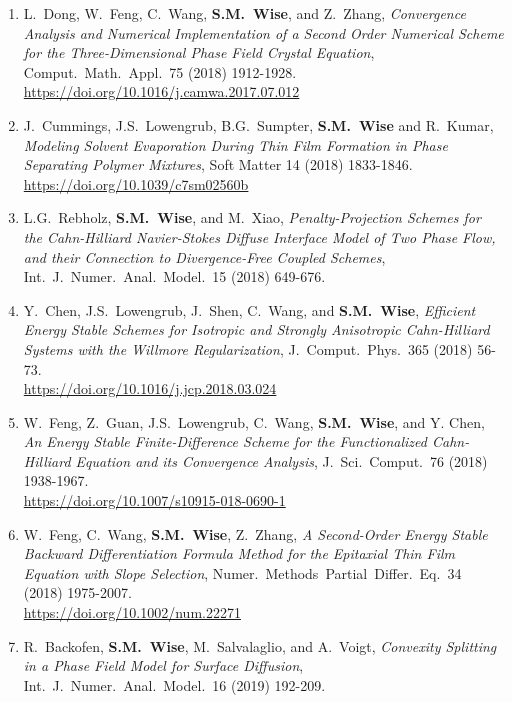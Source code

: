 \documentclass[11pt]{letter}
\begin{document}
\begin{enumerate}
	\item
L.~Dong, W.~Feng, C.~Wang, \textbf{S.M.~Wise}, and Z.~Zhang, {\sl Convergence Analysis and Numerical Implementation of a Second Order Numerical Scheme for the Three-Dimensional Phase Field Crystal Equation}, Comput.~Math.~Appl.~75 (2018) 1912-1928.
	\\ 
\url{https://doi.org/10.1016/j.camwa.2017.07.012}

	\item
J.~Cummings, J.S.~Lowengrub, B.G.~Sumpter, \textbf{S.M.~Wise} and R.~Kumar, {\sl Modeling Solvent Evaporation During Thin Film Formation in Phase Separating Polymer Mixtures}, Soft Matter 14 (2018) 1833-1846.
	\\ 
\url{https://doi.org/10.1039/c7sm02560b}

	\item
L.G.~Rebholz, \textbf{S.M.~Wise}, and M.~Xiao, {\it Penalty-Projection Schemes for the Cahn-Hilliard Navier-Stokes Diffuse Interface Model of Two Phase Flow, and their Connection to Divergence-Free Coupled Schemes}, Int.~J.~Numer.~Anal.~Model.~15 (2018) 649-676.

	\item
Y.~Chen, J.S.~Lowengrub, J.~Shen, C.~Wang, and \textbf{S.M.~Wise}, {\sl Efficient Energy Stable Schemes for Isotropic and Strongly Anisotropic Cahn-Hilliard Systems with the Willmore Regularization}, J.~Comput.~Phys.~365 (2018) 56-73.
	\\
\url{https://doi.org/10.1016/j.jcp.2018.03.024}

	\item
W.~Feng, Z.~Guan, J.S.~Lowengrub, C.~Wang, \textbf{S.M.~Wise}, and Y. Chen, {\sl An Energy Stable Finite-Difference Scheme for the Functionalized Cahn-Hilliard Equation and its Convergence Analysis}, J.~Sci.~Comput.~76 (2018) 1938-1967.
	\\ 
\url{https://doi.org/10.1007/s10915-018-0690-1}

	\item
W.~Feng, C.~Wang, \textbf{S.M.~Wise},  Z.~Zhang, {\sl A Second-Order Energy Stable Backward Differentiation Formula Method for the Epitaxial Thin Film Equation with Slope Selection}, Numer.~Methods~Partial~Differ.~Eq.~34 (2018) 1975-2007.
	\\ 
\url{https://doi.org/10.1002/num.22271}

	\item
R.~Backofen, \textbf{S.M.~Wise}, M.~Salvalaglio, and A.~Voigt, {\sl Convexity Splitting in a Phase Field Model for Surface Diffusion}, Int.~J.~Numer.~Anal.~Model.~16 (2019) 192-209.


\end{enumerate}
\end{document}
